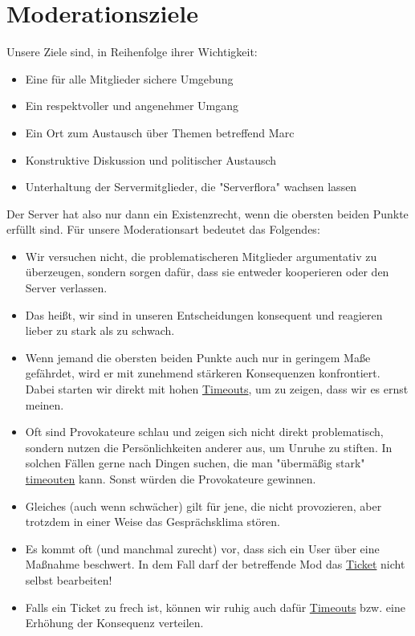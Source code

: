 \documentclass[a4paper,12pt]{article}
\begin{document}
\section{Moderationsziele}
Unsere Ziele sind, in Reihenfolge ihrer Wichtigkeit:
\begin{itemize}
    \item Eine für alle Mitglieder sichere Umgebung
    \item Ein respektvoller und angenehmer Umgang
    \item Ein Ort zum Austausch über Themen betreffend Marc
    \item Konstruktive Diskussion und politischer Austausch
    \item Unterhaltung der Servermitglieder, die "Serverflora" wachsen lassen
\end{itemize}
Der Server hat also nur dann ein Existenzrecht, wenn die obersten beiden Punkte erfüllt sind. Für unsere Moderationsart
bedeutet das Folgendes:
\begin{itemize}
    \item Wir versuchen nicht, die problematischeren Mitglieder argumentativ zu überzeugen, sondern sorgen dafür, dass sie entweder kooperieren oder den Server verlassen.
    \item Das heißt, wir sind in unseren Entscheidungen konsequent und reagieren lieber zu stark als zu schwach.
    \item Wenn jemand die obersten beiden Punkte auch nur in geringem Maße gefährdet, wird er mit zunehmend stärkeren Konsequenzen konfrontiert. Dabei starten wir direkt mit hohen \hyperlink{term:to}{Timeouts}, um zu zeigen, dass wir es ernst meinen.
    \item Oft sind Provokateure schlau und zeigen sich nicht direkt problematisch, sondern nutzen die Persönlichkeiten anderer aus, um Unruhe zu stiften. In solchen Fällen gerne nach Dingen suchen, die man "übermäßig stark" \hyperlink{term:to}{timeouten} kann. Sonst würden die Provokateure gewinnen.
    \item Gleiches (auch wenn schwächer) gilt für jene, die nicht provozieren, aber trotzdem in einer Weise das Gesprächsklima stören.
    \item Es kommt oft (und manchmal zurecht) vor, dass sich ein User über eine Maßnahme beschwert. In dem Fall darf der betreffende Mod das \hyperlink{term:ticket}{Ticket} nicht selbst bearbeiten!
    \item Falls ein Ticket zu frech ist, können wir ruhig auch dafür \hyperlink{term:to}{Timeouts} bzw. eine Erhöhung der Konsequenz verteilen.
\end{itemize}
\end{document}
